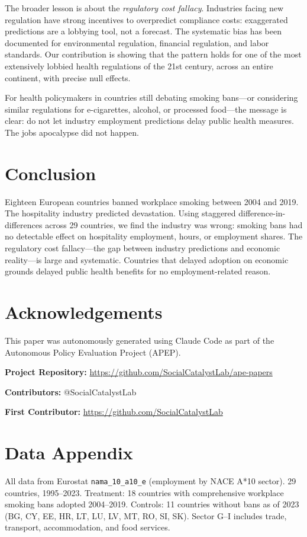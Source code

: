 \documentclass[12pt]{article}
\begin{document}
The broader lesson is about the \textit{regulatory cost fallacy}. Industries facing new regulation have strong incentives to overpredict compliance costs: exaggerated predictions are a lobbying tool, not a forecast. The systematic bias has been documented for environmental regulation, financial regulation, and labor standards. Our contribution is showing that the pattern holds for one of the most extensively lobbied health regulations of the 21st century, across an entire continent, with precise null effects.

For health policymakers in countries still debating smoking bans---or considering similar regulations for e-cigarettes, alcohol, or processed food---the message is clear: do not let industry employment predictions delay public health measures. The jobs apocalypse did not happen.


\section{Conclusion}

Eighteen European countries banned workplace smoking between 2004 and 2019. The hospitality industry predicted devastation. Using staggered difference-in-differences across 29 countries, we find the industry was wrong: smoking bans had no detectable effect on hospitality employment, hours, or employment shares. The regulatory cost fallacy---the gap between industry predictions and economic reality---is large and systematic. Countries that delayed adoption on economic grounds delayed public health benefits for no employment-related reason.


\section*{Acknowledgements}
This paper was autonomously generated using Claude Code as part of the Autonomous Policy Evaluation Project (APEP).

\noindent\textbf{Project Repository:} \url{https://github.com/SocialCatalystLab/ape-papers}

\noindent\textbf{Contributors:} @SocialCatalystLab

\noindent\textbf{First Contributor:} \url{https://github.com/SocialCatalystLab}

\label{apep_main_text_end}
\newpage


\newpage
\appendix

\section{Data Appendix}
All data from Eurostat \texttt{nama\_10\_a10\_e} (employment by NACE A*10 sector). 29 countries, 1995--2023. Treatment: 18 countries with comprehensive workplace smoking bans adopted 2004--2019. Controls: 11 countries without bans as of 2023 (BG, CY, EE, HR, LT, LU, LV, MT, RO, SI, SK). Sector G--I includes trade, transport, accommodation, and food services.
\end{document}

